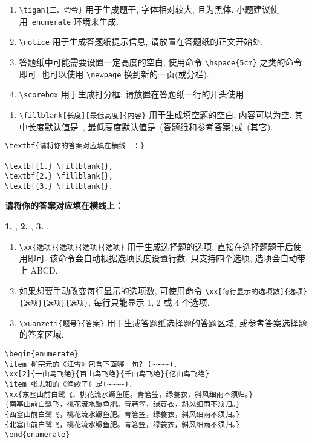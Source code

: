 \documentclass{hfutexam}
\begin{document}
\begin{enumerate}
\item \lstinline|\tigan{三、命令}| 用于生成题干, 字体相对较大, 且为黑体. 小题建议使用~{\color{blue}\lstinline|enumerate|} 环境来生成.
\item \lstinline|\notice| 用于生成答题纸提示信息, 请放置在答题纸的正文开始处.
\item 答题纸中可能需要设置一定高度的空白, 使用命令 \lstinline|\hspace{5cm}| 之类的命令即可. 也可以使用 \lstinline|\newpage| 换到新的一页(或分栏).
\item \scorebox\lstinline|\scorebox| 用于生成打分框, 请放置在答题纸一行的开头使用.
\end{enumerate}

\begin{enumerate}
\item \lstinline|\fillblank[长度][最低高度]{内容}| 用于生成填空题的空白, 内容可以为空. 其中长度默认值是~{\color{blue}{\lstinline|3.5cm|}}, 最低高度默认值是~{\color{blue}{\lstinline|1cm|}}(答题纸和参考答案)或~{\color{blue}{\lstinline|0.5cm|}}(其它).
\end{enumerate}

\textit{\color{blue}{示例:}}
\begin{lstlisting}
\textbf{请将你的答案对应填在横线上：}

\textbf{1.} \fillblank{}, 
\textbf{2.} \fillblank{}, 
\textbf{3.} \fillblank{}.
\end{lstlisting}
\textbf{请将你的答案对应填在横线上：}

\textbf{1.} \fillblank[3.5cm][1cm]{}, 
\textbf{2.} \fillblank[3.5cm][1cm]{}, 
\textbf{3.} \fillblank[3.5cm][1cm]{}.


\begin{enumerate}
\item \lstinline|\xx{选项}{选项}{选项}{选项}| 用于生成选择题的选项, 直接在选择题题干后使用即可. 该命令会自动根据选项长度设置行数. 只支持四个选项, 选项会自动带上 ABCD.
\item 如果想要手动改变每行显示的选项数, 可使用命令 \lstinline|\xx[每行显示的选项数]{选项}{选项}{选项}{选项}|, 每行只能显示 1, 2 或 4 个选项.
\item \lstinline|\xuanzeti{题号}{答案}| 用于生成答题纸选择题的答题区域, 或参考答案选择题的答案区域.
\end{enumerate}

\textit{\color{blue}{示例:}}
\begin{lstlisting}
\begin{enumerate}
\item 柳宗元的《江雪》包含下面哪一句? (~~~~).
\xx[2]{一山鸟飞绝}{百山鸟飞绝}{千山鸟飞绝}{亿山鸟飞绝}
\item 张志和的《渔歌子》是(~~~~).
\xx{东塞山前白鹭飞，桃花流水鳜鱼肥。青箬笠，绿蓑衣，斜风细雨不须归。}
{南塞山前白鹭飞，桃花流水鳜鱼肥。青箬笠，绿蓑衣，斜风细雨不须归。}
{西塞山前白鹭飞，桃花流水鳜鱼肥。青箬笠，绿蓑衣，斜风细雨不须归。}
{北塞山前白鹭飞，桃花流水鳜鱼肥。青箬笠，绿蓑衣，斜风细雨不须归。}
\end{enumerate}
\end{lstlisting}
\end{document}
